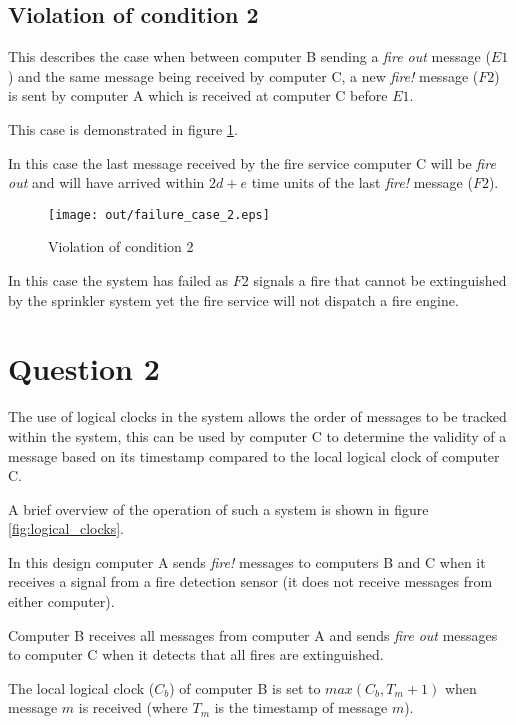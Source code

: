 \documentclass[twocolumn]{article}
\begin{document}
\subsection{Violation of condition 2}
\label{sec:violation_of_condition_2}

This describes the case when between computer B sending a \textit{fire out}
message ($E1$) and the same message being received by computer C, a new
\textit{fire!} message ($F2$) is sent by computer A which is received at
computer C before $E1$.

This case is demonstrated in figure \ref{fig:failure_case_2}.

In this case the last message received by the fire service computer C will be
\textit{fire out} and will have arrived within $2d + e$ time units of the last
\textit{fire!} message ($F2$).

\begin{figure}[h!]
  \centering
  \texttt{[image: out/failure\_case\_2.eps]}
  \caption{Violation of condition 2}
  \label{fig:failure_case_2}
\end{figure}

In this case the system has failed as $F2$ signals a fire that cannot be
extinguished by the sprinkler system yet the fire service will not dispatch a
fire engine.

\section{Question 2}
\label{sec:question_2}

The use of logical clocks in the system allows the order of messages to be
tracked within the system, this can be used by computer C to determine the
validity of a message based on its timestamp compared to the local logical
clock of computer C.

A brief overview of the operation of such a system is shown in figure
\ref{fig:logical_clocks}.

In this design computer A sends \textit{fire!} messages to computers B and C
when it receives a signal from a fire detection sensor (it does not receive
messages from either computer).

Computer B receives all messages from computer A and sends \textit{fire out}
messages to computer C when it detects that all fires are extinguished.

The local logical clock ($C_{b}$) of computer B is set to $max(C_{b}, T_{m} +
1)$ when message $m$ is received (where $T_{m}$ is the timestamp of message
$m$).
\end{document}
